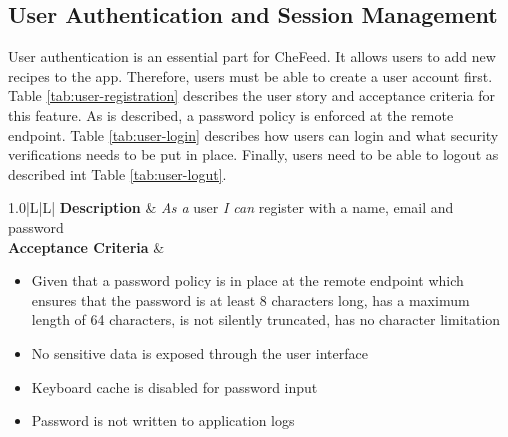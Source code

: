 \subsection{User Authentication and Session Management}
User authentication is an essential part for CheFeed. It allows users to add new recipes to the app. Therefore, users must be able to create a user account first. Table \ref{tab:user-registration} describes the user story and acceptance criteria for this feature. As is described, a password policy is enforced at the remote endpoint. Table \ref{tab:user-login} describes how users can login and what security verifications needs to be put in place. Finally, users need to be able to logout as described int Table \ref{tab:user-logut}.

\begin{table}[h]
    \centering
    \caption{User registration}
    \label{tab:user-registration}
    \begin{tabulary}{1.0\textwidth}{|L|L|}
        \hline
        \textbf{Description} & \textit{As a} user \textit{I can} register with a name, email and password \\
        \hline
        \textbf{Acceptance Criteria} & 
            \begin{itemize}
                \item Given that a password policy is in place at the remote endpoint which ensures that the password is at least 8 characters long, has a maximum length of 64 characters, is not silently truncated, has no character limitation
                \item No sensitive data is exposed through the user interface
                \item Keyboard cache is disabled for password input
                \item Password is not written to application logs
            \end{itemize}
        \\
        \hline
    \end{tabulary}
\end{table}

